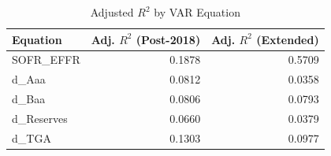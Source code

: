 \begin{table}[htbp]
\centering
\caption{Adjusted $R^2$ by VAR Equation} 
\label{tab:var_rsquared}
\begin{tabular}{lrr}
  \toprule
Equation & Adj. $R^2$ (Post-2018) & Adj. $R^2$ (Extended) \\ 
  \midrule
SOFR_EFFR & 0.1878 & 0.5709 \\ 
  d_Aaa & 0.0812 & 0.0358 \\ 
  d_Baa & 0.0806 & 0.0793 \\ 
  d_Reserves & 0.0660 & 0.0379 \\ 
  d_TGA & 0.1303 & 0.0977 \\ 
   \bottomrule
\end{tabular}
\end{table}

